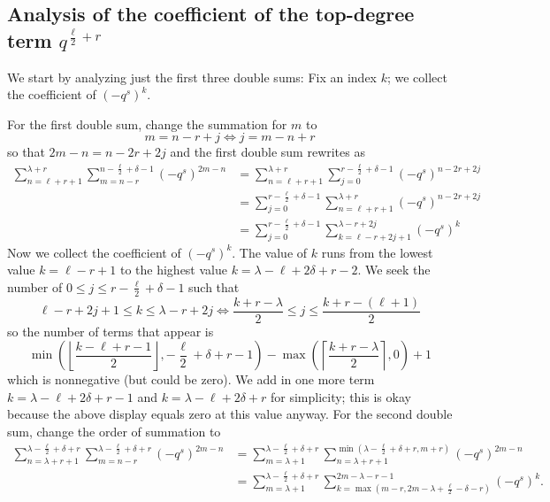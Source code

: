 \subsection{Analysis of the coefficient of the top-degree term $q^{\frac{\ell}{2}+r}$}
We start by analyzing just the first three double sums:
Fix an index $k$; we collect the coefficient of $(-q^s)^k$.
\begin{itemize}
  \ii For the first double sum, change the summation for $m$ to
  \[ m = n-r + j \iff j = m - n + r \]
  so that $2m - n = n - 2r + 2j$
  and the first double sum rewrites as
  \begin{align*}
    \sum_{n=\ell+r+1}^{\lambda+r} \sum_{m=n-r}^{n-\frac{\ell}{2}+\delta-1} (-q^s)^{2m-n}
    &= \sum_{n=\ell+r+1}^{\lambda+r}
      \sum_{j=0}^{r-\frac{\ell}{2}+\delta-1} (-q^s)^{n-2r+2j} \\
    &= \sum_{j=0}^{r-\frac{\ell}{2}+\delta-1} \sum_{n=\ell+r+1}^{\lambda+r}
      (-q^s)^{n-2r+2j} \\
    &= \sum_{j=0}^{r-\frac{\ell}{2}+\delta-1}
    \sum_{k=\ell-r+2j+1}^{\lambda-r+2j} (-q^s)^k
  \end{align*}
  Now we collect the coefficient of $(-q^s)^k$.
  The value of $k$ runs from the lowest value $k = \ell-r+1$
  to the highest value $k = \lambda - \ell + 2 \delta + r - 2$.
  We seek the number of $0 \le j \le r-\frac{\ell}{2}+\delta-1$ such that
  \[ \ell - r + 2j + 1 \le k \le \lambda - r + 2j
    \iff \frac{k + r - \lambda}{2} \le j \le \frac{k + r - (\ell + 1)}{2} \]
  so the number of terms that appear is
  \[
    \min\left( \left\lfloor \frac{k -\ell + r - 1}{2} \right\rfloor, - \frac{\ell}{2} + \delta + r - 1 \right)
    - \max\left( \left\lceil \frac{k + r -\lambda}{2} \right\rceil, 0 \right)
    + 1
  \]
  which is nonnegative (but could be zero).
  We add in one more term $k = \lambda - \ell + 2 \delta + r - 1$
  and $k = \lambda - \ell + 2 \delta + r$ for simplicity;
  this is okay because the above display equals zero at this value anyway.
  \ii For the second double sum, change the order of summation to
  \begin{align*}
    \sum_{n=\lambda+r+1}^{\lambda-\frac{\ell}{2}+\delta+r}
      \sum_{m=n-r}^{\lambda-\frac{\ell}{2}+\delta+r} (-q^s)^{2m-n}
    &= \sum_{m=\lambda+1}^{\lambda-\frac{\ell}{2}+\delta+r}
      \sum_{n=\lambda+r+1}^{\min\left( \lambda-\frac{\ell}{2}+\delta+r, m+r \right)} (-q^s)^{2m-n} \\
    &= \sum_{m=\lambda+1}^{\lambda-\frac{\ell}{2}+\delta+r}
      \sum_{k=\max\left( m-r, 2m-\lambda+\frac{\ell}{2}-\delta-r \right)}^{2m-\lambda-r-1} (-q^s)^k.

\end{align*}
\end{itemize}
